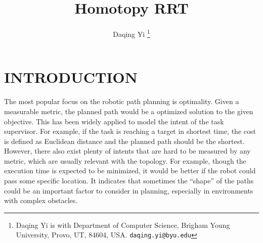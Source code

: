 \documentclass[letterpaper, 10 pt, conference]{ieeeconf}
\title{\LARGE \bf
Homotopy RRT
}
\author{
Daqing Yi
\thanks{Daqing Yi is with Department of Computer Science, Brigham Young University, Provo, UT, 84604, USA.
{\tt\small daqing.yi@byu.edu} }
}
\begin{document}
\maketitle
\thispagestyle{empty}
\pagestyle{empty}


\begin{abstract}



\end{abstract}


\section{INTRODUCTION}
\label{sec:intro}

The most popular focus on the robotic path planning is optimality.
Given a measurable metric, the planned path would be a optimized solution to the given objective.
This has been widely applied to model the intent of the task supervisor.
For example, if the task is reaching a target in shortest time, the cost is defined as Euclidean distance and the planned path should be the shortest.
However, there also exist plenty of intents that are hard to be measured by any metric, which are usually relevant with the topology.
For example, though the execution time is expected to be minimized, it would be better if the robot could pass some specific location.
It indicates that sometimes the ``shape'' of the paths could be an important factor to consider in planning, especially in environments with complex obstacles.






\end{document}
